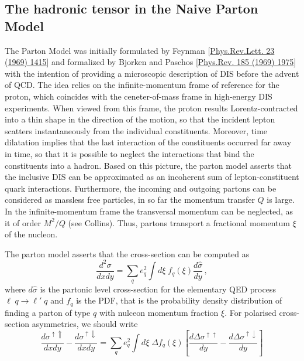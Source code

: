 \subsection{The hadronic tensor in the Naive Parton Model}
The Parton Model was initially formulated by Feynman [\href{https://journals.aps.org/prl/abstract/10.1103/PhysRevLett.23.1415}{Phys.Rev.Lett. 23 (1969) 1415}] and formalized by Bjorken and Paschos [\href{https://journals.aps.org/pr/abstract/10.1103/PhysRev.185.1975}{Phys.Rev. 185 (1969) 1975}] with the intention of providing a microscopic description of DIS before the advent of QCD. The idea relies on the infinite-momentum frame of reference for the proton, which coincides with the ceneter-of-mass frame in high-energy DIS experiments. When viewed from this frame, the proton results Lorentz-contracted into a thin shape in the direction of the motion, so that the incident lepton scatters instantaneously from the individual constituents. Moreover, time dilatation implies that the last interaction of the constituents occurred far away in time, so that it is possible to neglect the interactions that bind the constituents into a hadron. Based on this picture, the parton model asserts that the inclusive DIS can be approximated as an incoherent sum of lepton-constituent quark interactions. Furthermore, the incoming and outgoing partons can be considered as massless free particles, in so far the momentum transfer $Q$ is large. In the infinite-momentum frame the transversal momentum can be neglected, as it of order $M^2/Q$ (see Collins). Thus, partons transport a fractional momentum $\xi$ of the nucleon.\par
The parton model asserts that the cross-section can be computed as
\begin{equation}
  \frac{d^2 \sigma}{dx dy} = \sum_{q} e_q^2 \int d\xi \;f_q (\xi) \frac{d \hat{\sigma}}{dy}\,,
  \label{eq:PM_CS}
\end{equation}
where $d \hat{\sigma}$ is the partonic level cross-section for the elementary QED process $\ell \; q \rightarrow \ell' \; q$ and $f_q$ is the PDF, that is the probability density distribution of finding a parton of type $q$ with nulceon momentum fraction $\xi$. For polarised cross-section asymmetries, we should write
\begin{equation}
  \frac{d \sigma^{\uparrow \Uparrow}}{dx dy} - \frac{d \sigma^{\uparrow \Downarrow}}{dx dy} = \sum_{q} e_q^2 \int d\xi \; \Delta f_q (\xi) \left[ \frac{d \Delta \sigma^{\uparrow \uparrow}}{dy} - \frac{d \Delta \sigma^{\uparrow \downarrow}}{dy} \right]
  \label{eq:PM_fact}
\end{equation}
